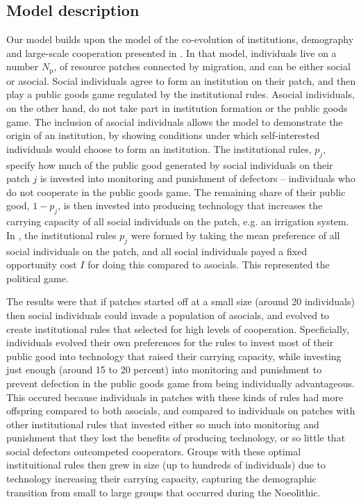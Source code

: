 \documentclass{rstb}
\begin{document}
\begin{linenumbers}
\section*{Model description}
Our model builds upon the model of the co-evolution of institutions, demography and large-scale cooperation presented in \cite{Powers:2013:a}. In that model, individuals live on a number $N_\mathrm{p}$, of resource patches connected by migration, and can be either social or asocial. Social individuals agree to form an institution on their patch, and then play a public goods game regulated by the institutional rules. Asocial individuals, on the other hand, do not take part in institution formation or the public goods game. The inclusion of asocial individuals allows the model to demonstrate the origin of an institution, by showing conditions under which self-interested individuals would choose to form an institution. The institutional rules, $p_j$, specify how much of the public good generated by social individuals on their patch $j$ is invested into monitoring and punishment of defectors -- individuals who do not cooperate in the public goods game. The remaining share of their public good, $1-p_j$, is then invested into producing technology that increases the carrying capacity of all social individuals on the patch, e.g. an irrigation system. In \cite{Powers:2013:a}, the institutional rules $p_j$ were formed by taking the mean preference of all social individuals on the patch, and all social individuals payed a fixed opportunity cost $I$ for doing this compared to asocials. This represented the political game. 

The results were that if patches started off at a small size (around 20 individuals) then social individuals could invade a population of asocials, and evolved to create institutional rules that selected for high levels of cooperation. Specficially, individuals evolved their own preferences for the rules to invest most of their public good into technology that raised their carrying capacity, while investing just enough (around 15 to 20 percent) into monitoring and punishment to prevent defection in the public goods game from being individually advantageous. This occured because individuals in patches with these kinds of rules had more offspring compared to both asocials, and compared to individuals on patches with other institutional rules that invested either so much into monitoring and punishment that they lost the benefits of producing technology, or so little that social defectors outcompeted cooperators. Groups with these optimal instituitional rules then grew in size (up to hundreds of individuals) due to technology increasing their carrying capacity, capturing the demographic transition from small to large groups that occurred during the Noeolithic.


\end{linenumbers}
\end{document}
